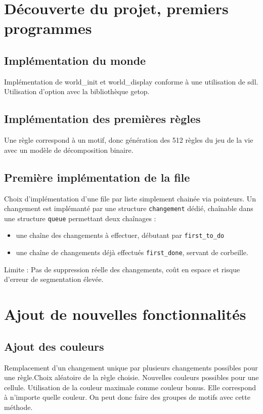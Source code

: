 \section{Découverte du projet, premiers programmes}

\subsection{Implémentation du monde}
Implémentation de world\_init et world\_display conforme à une utilisation de sdl. Utilisation d'option avec la bibliothèque getop.

\subsection{Implémentation des premières règles}
Une règle correspond à un motif, donc génération des 512 règles du jeu de la vie avec un modèle de décomposition binaire.

\subsection{Première implémentation de la file}
Choix d'implémentation d'une file par liste simplement chainée via pointeurs. Un changement est implémanté par une structure \texttt{changement} dédié, chaînable dans une structure \texttt{queue} permettant deux chaînages :
\begin{itemize}
    \item une chaîne des changements à effectuer, débutant par \texttt{first\_to\_do}
    \item une chaîne de changements déjà effectués \texttt{first\_done}, servant de corbeille.
\end{itemize}
Limite : Pas de suppression réelle des changements, coût en espace et risque d'erreur de segmentation élevée.

\section{Ajout de nouvelles fonctionnalités}
\subsection{Ajout des couleurs}
Remplacement d'un changement unique par plusieurs changements possibles pour une règle.Choix aléatoire de la règle choisie. Nouvelles couleurs possibles pour une cellule. Utilisation de la couleur maximale comme couleur bonus. Elle correspond à n'importe quelle couleur. On peut donc faire des groupes de motifs avec cette méthode.

